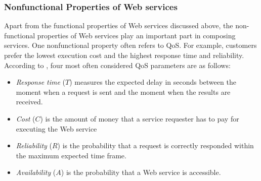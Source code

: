 
\subsubsection{Nonfunctional Properties of Web services}\label{nonfunctional}
Apart from the functional properties of Web services discussed above, the non-functional properties of Web services play an important part in composing services. One nonfunctional property often refers to QoS. For example, customers prefer the lowest execution cost and the highest response time and reliability. According to \cite{zeng2003quality}, four most often considered QoS parameters are as follows:
\begin{itemize}
\item \textit{Response time} ($T$) measures the expected delay in seconds between the moment when a request is sent and the moment when the results are received.
\item \textit{Cost} ($C$) is the amount of money that a service requester has to pay for executing the Web service
\item \textit{Reliability} ($R$) is the probability that a request is correctly responded within the maximum expected time frame.
\item \textit{Availability} ($A$) is the probability that a Web service is accessible.
\end{itemize}

